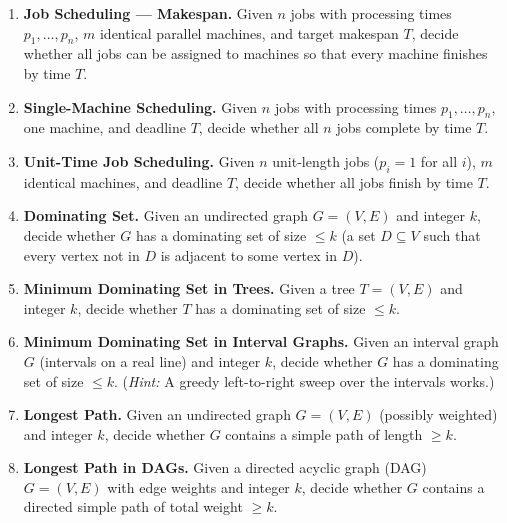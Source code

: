 \documentclass[9pt]{book}
\begin{document}
\begin{enumerate}[label=\arabic*.]
\bigskip

\item \textbf{Job Scheduling — Makespan.}
Given $n$ jobs with processing times $p_1,\ldots,p_n$, $m$ identical parallel machines, 
and target makespan $T$, decide whether all jobs can be assigned to machines so that 
every machine finishes by time $T$.

\bigskip

\item \textbf{Single-Machine Scheduling.}
Given $n$ jobs with processing times $p_1,\ldots,p_n$, one machine, and deadline 
$T$, decide whether all $n$ jobs complete by time $T$.

\bigskip

\item \textbf{Unit-Time Job Scheduling.}
Given $n$ unit-length jobs ($p_i=1$ for all $i$), $m$ identical machines, and 
deadline $T$, decide whether all jobs finish by time $T$.

\bigskip

\item \textbf{Dominating Set.}
Given an undirected graph $G=(V,E)$ and integer $k$, decide whether $G$ has 
a dominating set of size $\leq k$ (a set $D\subseteq V$ such that every vertex 
not in $D$ is adjacent to some vertex in $D$).

\bigskip

\item \textbf{Minimum Dominating Set in Trees.}
Given a tree $T=(V,E)$ and integer $k$, decide whether $T$ has a dominating 
set of size $\leq k$.

\bigskip

\item \textbf{Minimum Dominating Set in Interval Graphs.}
Given an interval graph $G$ (intervals on a real line) and integer $k$, 
decide whether $G$ has a dominating set of size $\leq k$.
(\textit{Hint:} A greedy left-to-right sweep over the intervals works.)

\bigskip

\item \textbf{Longest Path.}
Given an undirected graph $G=(V,E)$ (possibly weighted) and integer $k$, decide 
whether $G$ contains a simple path of length $\geq k$.

\bigskip

\item \textbf{Longest Path in DAGs.}
Given a directed acyclic graph (DAG) $G=(V,E)$ with edge weights and integer 
$k$, decide whether $G$ contains a directed simple path of total weight $\geq k$.


\end{enumerate}
\end{document}
